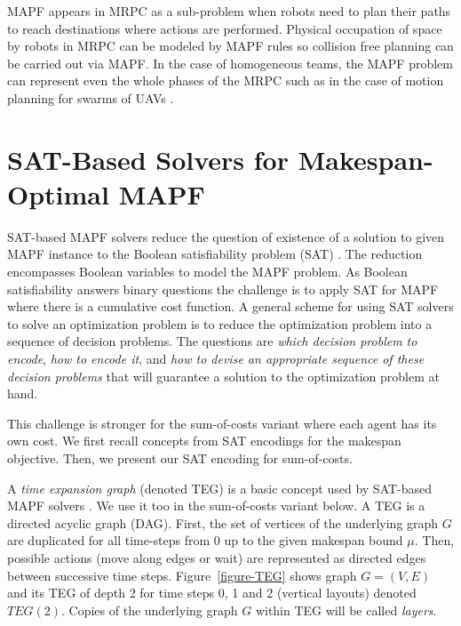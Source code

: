 \documentclass[jair,oneside,11pt]{article}
\begin{document}
MAPF appears in MRPC as a sub-problem when robots need to plan their paths to reach destinations where actions are performed. Physical occupation of space by robots in MRPC can be modeled by MAPF rules so collision free planning can be carried out via MAPF. In the case of homogeneous teams, the MAPF problem can represent even the whole phases of the MRPC such as in the case of motion planning for swarms of UAVs \cite{DBLP:journals/ijrr/KumarM12,DBLP:conf/swarm/SorliGB17}.


\section{SAT-Based Solvers for Makespan-Optimal MAPF}

\noindent SAT-based MAPF solvers reduce the question of existence of a solution to given MAPF instance to the Boolean satisfiability problem (SAT) \cite{Biere:2009:HSV:1550723}. The reduction encompasses Boolean variables to model the MAPF problem. As Boolean satisfiability answers binary questions the challenge is to apply SAT for MAPF where there is a cumulative cost function. A general scheme for using SAT solvers to solve an optimization problem is to reduce the optimization problem into a sequence of decision problems. The questions are {\em which decision problem to encode}, {\em how to encode it},  and {\em how to devise an appropriate sequence of these decision problems} that will guarantee a solution to the optimization problem at hand.


This challenge is stronger for the sum-of-costs variant where each agent has its own cost. We first recall concepts from SAT encodings for the makespan objective. Then, we present our SAT encoding for sum-of-costs.



A {\em time expansion graph} (denoted TEG) is a basic concept used by SAT-based MAPF solvers \cite{DBLP:conf/ictai/Surynek14,DBLP:conf/ecai/SurynekFSB16}. We use it too in the sum-of-costs variant below. A TEG is a directed acyclic graph (DAG). First, the set of vertices of the underlying graph $G$ are duplicated for all time-steps from 0 up to the given makespan bound $\mu$. Then, possible actions (move along edges or wait) are represented as directed edges between successive time steps. Figure~\ref{figure-TEG} shows graph $G=(V,E)$ and its TEG of depth 2 for time steps 0, 1 and 2 (vertical layouts) denoted $TEG(2)$. Copies of the underlying graph $G$ within TEG will be called {\em layers}.
\end{document}
